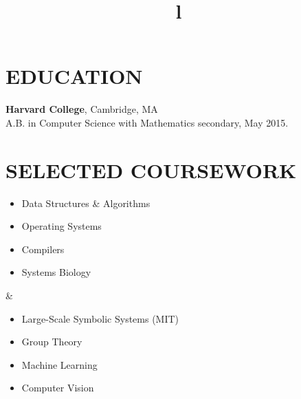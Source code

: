 \documentclass[centered, margin, 10pt]{res} %
\title{l}\\
\newenvironment{rlist}
    {\begin{minipage}[t]{\linewidth}\begin{itemize}\raggedright}
    {\end{itemize}\end{minipage}}
\begin{document}

\address{(address redacted)}


\begin{resume}


\section{EDUCATION}

{\bf Harvard College}, Cambridge, MA
\\
A.B. in Computer Science with Mathematics secondary, May 2015.


\section{SELECTED COURSEWORK}

\begin{ncolumn}{2}
  \begin{rlist}
    \item Data Structures \& Algorithms
    \item Operating Systems
    \item Compilers
    \item Systems Biology
  \end{rlist}
  &
  \begin{rlist}
    \item Large-Scale Symbolic Systems (MIT)
    \item Group Theory
    \item Machine Learning
    \item Computer Vision
  \end{rlist}
\end{ncolumn}


\end{resume}
\end{document}
